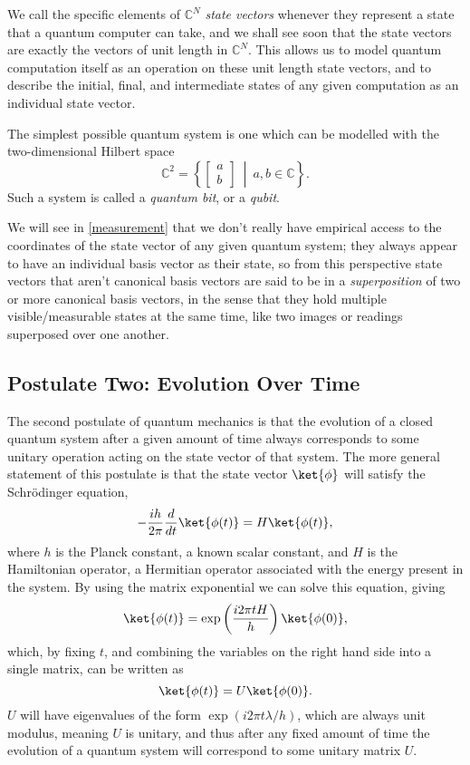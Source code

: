 We call the specific elements of $\mathbb{C}^N$ \emph{state vectors} whenever they represent a state that a quantum computer can take, and we shall see soon that the state vectors are exactly the vectors of unit length in $\mathbb{C}^N$. This allows us to model quantum computation itself as an operation on these unit length state vectors, and to describe the initial, final, and intermediate states of any given computation as an individual state vector.

The simplest possible quantum system is one which can be modelled with the two-dimensional Hilbert space
\[
\mathbb{C}^2 = \left\{\left[\begin{matrix}
a\\
b
\end{matrix}\right]\ \middle|\ a, b \in \mathbb{C}\right\}.
\]
Such a system is called a \emph{quantum bit}, or a \emph{qubit}.

We will see in \autoref{measurement} that we don't really have empirical access to the coordinates of the state vector of any given quantum system; they always appear to have an individual basis vector as their state, so from this perspective state vectors that aren't canonical basis vectors are said to be in a \emph{superposition} of two or more canonical basis vectors, in the sense that they hold multiple visible/measurable states at the same time, like two images or readings superposed over one another.

\subsection{Postulate Two: Evolution Over Time}\label{evolution}
The second postulate of quantum mechanics is that the evolution of a closed quantum system after a given amount of time always corresponds to some unitary operation acting on the state vector of that system. The more general statement of this postulate is that the state vector $\ket{\phi}$ will satisfy the Schrödinger equation,
\[-\frac{ih}{2\pi}\frac{d}{dt}\ket{\phi(t)} = H\ket{\phi(t)},\]
where $h$ is the Planck constant, a known scalar constant, and $H$ is the Hamiltonian operator, a Hermitian operator associated with the energy present in the system. By using the matrix exponential we can solve this equation, giving
\[\ket{\phi(t)} = \exp\left(\frac{i 2\pi tH}{h}\right)\ket{\phi(0)},\]
which, by fixing $t$, and combining the variables on the right hand side into a single matrix, can be written as
\[\ket{\phi(t)} = U\ket{\phi(0)}.\]
$U$ will have eigenvalues of the form $\exp(i2\pi t\lambda/h)$, which are always unit modulus, meaning $U$ is unitary, and thus after any fixed amount of time the evolution of a quantum system will correspond to some unitary matrix $U$.

